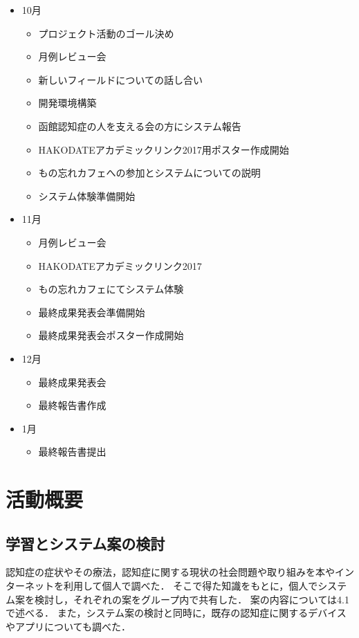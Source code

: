 \documentclass[../report]{subfiles}
\begin{document}
\begin{itemize}
\begin{itemize}
    \end{itemize}
  \item[] 10月
    \begin{itemize}
      \item プロジェクト活動のゴール決め
      \item 月例レビュー会
      \item 新しいフィールドについての話し合い
      \item 開発環境構築
      \item 函館認知症の人を支える会の方にシステム報告
      \item HAKODATEアカデミックリンク2017用ポスター作成開始
      \item もの忘れカフェへの参加とシステムについての説明
      \item システム体験準備開始
    \end{itemize}
  \item[] 11月
    \begin{itemize}
      \item 月例レビュー会
      \item HAKODATEアカデミックリンク2017
      \item もの忘れカフェにてシステム体験
      \item 最終成果発表会準備開始
      \item 最終成果発表会ポスター作成開始
    \end{itemize}
  \item[] 12月
    \begin{itemize}
      \item 最終成果発表会
      \item 最終報告書作成
    \end{itemize}
  \item[] 1月
    \begin{itemize}
      \item 最終報告書提出
    \end{itemize}
\end{itemize}


\section{活動概要}
\subsection{学習とシステム案の検討} \label{sec:discuss}
認知症の症状やその療法，認知症に関する現状の社会問題や取り組みを本やインターネットを利用して個人で調べた．
そこで得た知識をもとに，個人でシステム案を検討し，それぞれの案をグループ内で共有した．
案の内容については4.1 で述べる．
また，システム案の検討と同時に，既存の認知症に関するデバイスやアプリについても調べた．
\end{document}
